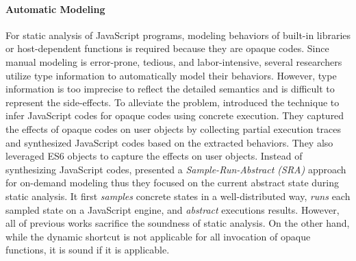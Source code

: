 \paragraph{Automatic Modeling}
For static analysis of JavaScript programs, modeling behaviors of built-in
libraries or host-dependent functions is required because they are opaque
codes.  Since manual modeling is error-prone, tedious, and labor-intensive,
several researchers~\cite{safewapi, safets} utilize type information to
automatically model their behaviors.  However, type information is too imprecise
to reflect the detailed semantics and is difficult to represent the
side-effects.  To alleviate the problem, \citet{mimic} introduced the technique
to infer JavaScript codes for opaque codes using concrete execution.  They
captured the effects of opaque codes on user objects by collecting partial
execution traces and synthesized JavaScript codes based on the extracted
behaviors.  They also leveraged ES6  objects to capture the
effects on user objects.  Instead of synthesizing JavaScript codes,
\citet{opaque-model} presented a \textit{Sample-Run-Abstract (SRA)} approach for
on-demand modeling thus they focused on the current abstract state during static
analysis.  It first \textit{samples} concrete states in a well-distributed way,
\textit{runs} each sampled state on a JavaScript engine, and \textit{abstract}
executions results.  However, all of previous works sacrifice the soundness of
static analysis.  On the other hand, while the dynamic shortcut is not
applicable for all invocation of opaque functions, it is sound if it is
applicable.


